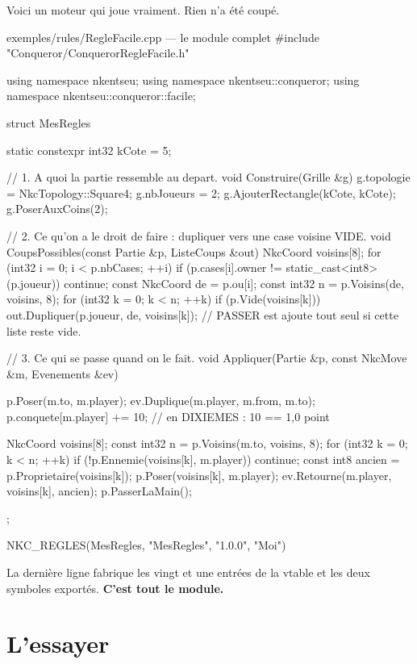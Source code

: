 Voici un moteur qui joue vraiment. Rien n'a été coupé.

\begin{nkcode}{exemples/rules/RegleFacile.cpp --- le module complet}
#include "Conqueror/ConquerorRegleFacile.h"

using namespace nkentseu;
using namespace nkentseu::conqueror;
using namespace nkentseu::conqueror::facile;

struct MesRegles {

    static constexpr int32 kCote = 5;

    // 1. A quoi la partie ressemble au depart.
    void Construire(Grille &g) {
        g.topologie = NkcTopology::Square4;
        g.nbJoueurs = 2;
        g.AjouterRectangle(kCote, kCote);
        g.PoserAuxCoins(2);
    }

    // 2. Ce qu'on a le droit de faire : dupliquer vers une case voisine VIDE.
    void CoupsPossibles(const Partie &p, ListeCoups &out) {
        NkcCoord voisins[8];
        for (int32 i = 0; i < p.nbCases; ++i) {
            if (p.cases[i].owner != static_cast<int8>(p.joueur)) continue;
            const NkcCoord de = p.ou[i];
            const int32    n  = p.Voisins(de, voisins, 8);
            for (int32 k = 0; k < n; ++k)
                if (p.Vide(voisins[k]))
                    out.Dupliquer(p.joueur, de, voisins[k]);
        }
        // PASSER est ajoute tout seul si cette liste reste vide.
    }

    // 3. Ce qui se passe quand on le fait.
    void Appliquer(Partie &p, const NkcMove &m, Evenements &ev) {
        p.Poser(m.to, m.player);
        ev.Duplique(m.player, m.from, m.to);
        p.conquete[m.player] += 10;   // en DIXIEMES : 10 == 1,0 point

        NkcCoord    voisins[8];
        const int32 n = p.Voisins(m.to, voisins, 8);
        for (int32 k = 0; k < n; ++k) {
            if (!p.Ennemie(voisins[k], m.player)) continue;
            const int8 ancien = p.Proprietaire(voisins[k]);
            p.Poser(voisins[k], m.player);
            ev.Retourne(m.player, voisins[k], ancien);
        }
        p.PasserLaMain();
    }
};

NKC_REGLES(MesRegles, "MesRegles", "1.0.0", "Moi")
\end{nkcode}

La dernière ligne fabrique les vingt et une entrées de la vtable et les deux
symboles exportés. \textbf{C'est tout le module.}

\section{L'essayer}

